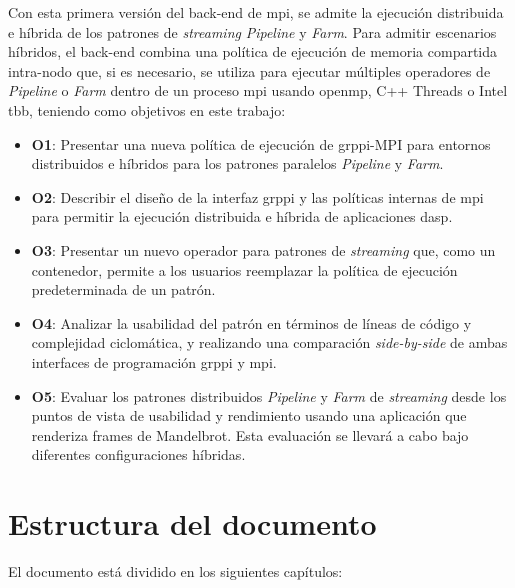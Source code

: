 \vspace{0.2cm}

Con esta primera versión del back-end de \acrshort{mpi}, se admite la ejecución distribuida e híbrida de los patrones de \emph{streaming} \emph{Pipeline} y \emph{Farm}. Para admitir escenarios híbridos, el back-end combina una política de ejecución de memoria compartida intra-nodo que, si es necesario, se utiliza para ejecutar múltiples operadores de \emph{Pipeline} o \emph{Farm} dentro de un proceso \acrshort{mpi} usando \acrshort{openmp}, C++ Threads o Intel \acrshort{tbb}, teniendo como objetivos en este trabajo:

\begin {itemize}
\item \textbf{O1}: Presentar una nueva política de ejecución de \acrshort{grppi}-MPI para entornos distribuidos e híbridos para los patrones paralelos \emph{Pipeline} y \emph{Farm}.
\item \textbf{O2}: Describir el diseño de la interfaz \acrshort{grppi} y las políticas internas de \acrshort{mpi} para permitir la ejecución distribuida e híbrida de aplicaciones \acrshort{dasp}.
\item \textbf{O3}: Presentar un nuevo operador para patrones de \emph{streaming} que, como un contenedor, permite a los usuarios reemplazar la política de ejecución predeterminada de un patrón.
\item \textbf{O4}: Analizar la usabilidad del patrón en términos de líneas de código y complejidad ciclomática, y realizando una comparación \emph{side-by-side} de ambas interfaces de programación \acrshort{grppi} y \acrshort{mpi}.
\item \textbf{O5}: Evaluar los patrones distribuidos \emph{Pipeline} y \emph{Farm} de \emph{streaming} desde los puntos de vista de usabilidad y rendimiento usando una aplicación que renderiza frames de Mandelbrot. Esta evaluación se llevará a cabo bajo diferentes configuraciones híbridas.
\end {itemize}

\vspace{0.2cm}


\section{Estructura del documento}
\label{sec:estructura_documento}

El documento está dividido en los siguientes capítulos:

